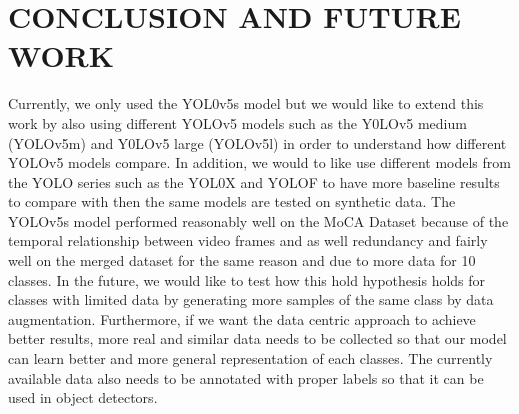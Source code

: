\documentclass[conference]{IEEEtran}
\begin{document}
\section{CONCLUSION AND FUTURE WORK}
Currently, we only used the YOL0v5s model but we would like to extend this work by also using different YOLOv5 models such as the Y0LOv5 medium (YOLOv5m) and Y0LOv5 large (YOLOv5l) in order to understand how different YOLOv5 models compare. In addition, we would to like use different models from the YOLO series such as the YOL0X and YOLOF to have more baseline results to compare with then the same models are tested on synthetic data. The YOLOv5s model performed reasonably well on the MoCA Dataset because of the temporal relationship between video frames and as well redundancy and fairly well on the merged dataset for the same reason and due to more data for 10 classes. In the future, we would like to test how this hold hypothesis holds for classes with limited data by generating more samples of the same class by data augmentation. Furthermore, if we want the data centric approach to achieve better results, more real and similar data needs to be collected so that our model can learn better and more general representation of each classes. The currently available data also needs to be annotated with proper labels so that it can be used in object detectors.







 












\end{document}
